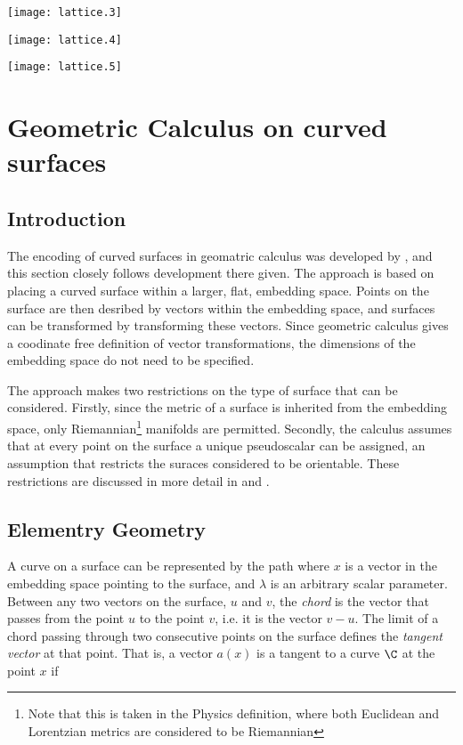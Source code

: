 \texttt{[image: lattice.3]}

\texttt{[image: lattice.4]}

\texttt{[image: lattice.5]}

\section{Geometric Calculus on curved surfaces}

\subsection{Introduction}
The encoding of curved surfaces in geomatric calculus was developed by
\cite{Hestenes1984}, and this section closely follows development
there given.
The approach is based on placing a curved surface within a larger, flat, embedding space.
Points on the surface are then desribed by vectors within the
embedding space, and surfaces can be transformed by transforming these
vectors.
Since geometric calculus gives a coodinate free definition of vector
transformations,
the dimensions of the embedding space do not need to be specified.

The approach makes two restrictions on the type of surface that can
be considered. 
Firstly, since the metric of a surface is inherited from the embedding
space,
only Riemannian\footnote{Note that this is taken in the Physics
  definition, where both Euclidean and Lorentzian metrics are
  considered to be Riemannian} manifolds are permitted.
Secondly, the calculus assumes that at every point on the surface a unique
pseudoscalar can be assigned, an assumption that restricts the suraces
considered to be orientable.  These restrictions are discussed in
more detail in \cite{Hestenes1984} and \cite{Doran2003}.

\subsection{Elementry Geometry}

A curve on a surface can be represented by the path
where $x$ is a vector in the embedding space pointing to the surface,
and $\lambda$ is an arbitrary scalar parameter.
Between any two vectors on the surface,  $u$ and $v$,
the {\em chord} is the vector that passes from the point $u$ to the
point $v$, i.e. it is the vector $v - u$.
The limit of a chord passing
through two consecutive points on the surface defines the {\em tangent
  vector} at that point.
That is, a vector $a(x)$ is a tangent to a curve $\C$ at the point $x$ if

